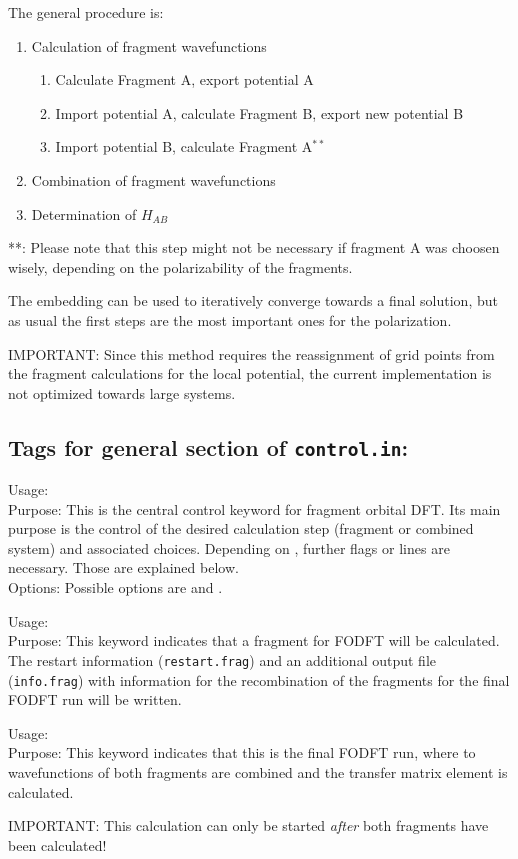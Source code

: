 The general procedure is:
\begin{enumerate}
\item Calculation of fragment wavefunctions
    \begin{enumerate}
        \item Calculate Fragment A, export potential A
        \item Import potential A, calculate Fragment B, export new potential B
        \item Import potential B, calculate Fragment A$^{**}$
    \end{enumerate}
\item Combination of fragment wavefunctions
\item Determination of $H_{AB}$ 
\end{enumerate}
**: Please note that this step might not be necessary if fragment A was choosen wisely, depending on the polarizability of the fragments. 

\vspace{0.2cm}
The embedding can be used to iteratively converge towards a final solution, but as usual the first steps are the most important ones for the polarization.

IMPORTANT: Since this method requires the reassignment of grid points from the fragment calculations for the local potential, the current implementation is not optimized towards large systems.

\subsection*{Tags for general section of \texttt{control.in}:}

{
  \noindent
  Usage:  \\[1.0ex]
  Purpose: This is the central control keyword for fragment orbital DFT. Its main purpose is the control of the desired calculation
  step (fragment or combined system) and associated choices. Depending on , further flags or lines are necessary. Those
  are explained below.\\[1.0ex]
  Options: Possible options are  and .
}

{
  \noindent
  Usage:  \\[1.0ex]
  Purpose: This keyword indicates that a fragment for FODFT will be calculated. The restart information (\texttt{restart.frag}) and an additional output file (\texttt{info.frag}) with information for the recombination of the fragments for the final FODFT run will be written.\\[1.0ex]
}
{
  \noindent
  Usage:  \\[1.0ex]
  Purpose: This keyword indicates that this is the final FODFT run, where to wavefunctions of both fragments are combined and the
  transfer matrix element is calculated.

  IMPORTANT: This calculation can only be started \emph{after} both fragments have been calculated!
}

